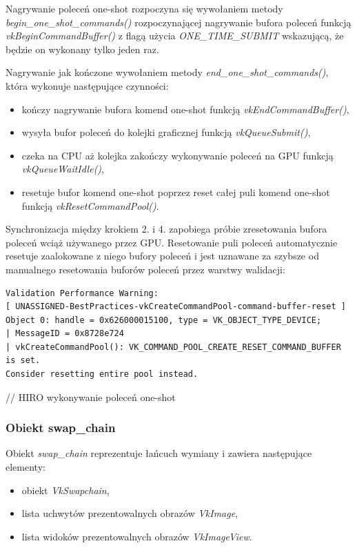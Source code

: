 Nagrywanie poleceń one-shot rozpoczyna się wywołaniem metody \textit{begin\_one\_shot\_commands()} rozpoczynającej nagrywanie bufora poleceń funkcją \textit{vkBeginCommandBuffer()} z flagą użycia \textit{ONE\_TIME\_SUBMIT} wskazującą, że będzie on wykonany tylko jeden raz.

Nagrywanie jak kończone wywołaniem metody \textit{end\_one\_shot\_commands()}, która wykonuje następujące czynności:
\begin{itemize}
	\item kończy nagrywanie bufora komend one-shot funkcją \textit{vkEndCommandBuffer()},
	\item wysyła bufor poleceń do kolejki graficznej funkcją \textit{vkQueueSubmit()},
	\item czeka na CPU aż kolejka zakończy wykonywanie poleceń na GPU funkcją \textit{vkQueueWaitIdle()},
	\item resetuje bufor komend one-shot poprzez reset całej puli komend one-shot funkcją \textit{vkResetCommandPool()}.
\end{itemize}
Synchronizacja między krokiem 2. i 4. zapobiega próbie zresetowania bufora poleceń wciąż używanego przez GPU. Resetowanie puli poleceń automatycznie resetuje zaalokowane z niego bufory poleceń i jest uznawane za szybsze od manualnego resetowania buforów poleceń przez warstwy walidacji:
\lstset{language=verbatim}
\begin{lstlisting}[caption={Ostrzeżenie wydajnościowe wyemitowane przez warstwy walidacji},captionpos=b]
Validation Performance Warning:
[ UNASSIGNED-BestPractices-vkCreateCommandPool-command-buffer-reset ]
Object 0: handle = 0x626000015100, type = VK_OBJECT_TYPE_DEVICE;
| MessageID = 0x8728e724
| vkCreateCommandPool(): VK_COMMAND_POOL_CREATE_RESET_COMMAND_BUFFER is set.
Consider resetting entire pool instead.
\end{lstlisting}

// HIRO wykonywanie poleceń one-shot

\subsubsection{Obiekt swap\_chain}
Obiekt \textit{swap\_chain} reprezentuje łańcuch wymiany i zawiera następujące elementy:
\begin{itemize}
	\item obiekt \textit{VkSwapchain},
	\item lista uchwytów prezentowalnych obrazów \textit{VkImage},
	\item lista widoków prezentowalnych obrazów \textit{VkImageView}.
\end{itemize}

